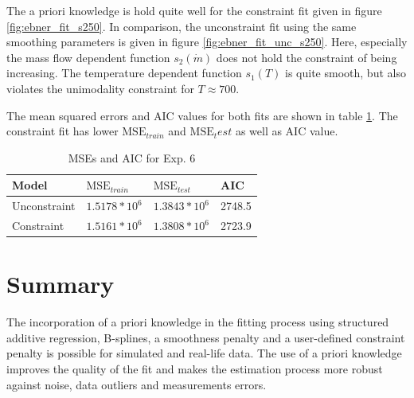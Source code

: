 \documentclass[10pt,a4paper]{article}
\begin{document}
The a priori knowledge is hold quite well for the constraint fit given in figure \ref{fig:ebner_fit_s250}. In comparison, the unconstraint fit using the same smoothing parameters is given in figure \ref{fig:ebner_fit_unc_s250}. Here, especially the mass flow dependent function $s_2(\dot m)$ does not hold the constraint of being increasing. The temperature dependent function $s_1(T)$ is quite smooth, but also violates the unimodality constraint for $T \approx 700$. 

The mean squared errors and AIC values for both fits are shown in table \ref{tab:metrics_6}. The constraint fit has lower $\text{MSE}_{train}$ and $\text{MSE}_test$ as well as AIC value. 


\begin{table}[H]
	\centering
	\begin{tabular}{|l|l|l|l|}
		\hline
		\textbf{Model} & \textbf{$\text{MSE}_{train}$} & \textbf{$\text{MSE}_{test}$}  & \textbf{AIC} \\ \hline \toprule
		Unconstraint  & $1.5178 * 10^{6}$  & $1.3843 * 10^{6}$ & 2748.5      \\ \hline
		Constraint    & $1.5161 * 10^{6}$  & $1.3808 * 10^{6}$ & 2723.9      \\ \hline
	\end{tabular}
	\caption{MSEs and AIC for Exp. 6}
	\label{tab:metrics_6}
\end{table}


\section{Summary}

The incorporation of a priori knowledge in the fitting process using structured additive regression, B-splines, a smoothness penalty and a user-defined constraint penalty is possible for simulated and real-life data. The use of a priori knowledge improves the quality of the fit and makes the estimation process more robust against noise, data outliers and measurements errors. 
\end{document}
